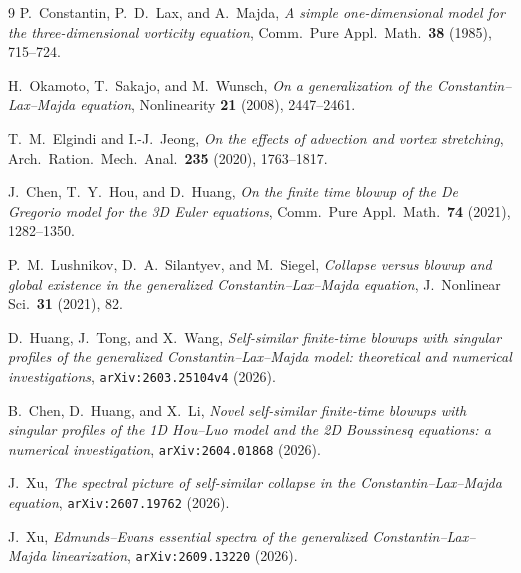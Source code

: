 \documentclass[11pt,a4paper]{article}
\begin{document}
\begin{thebibliography}{9}
P.~Constantin, P.~D.~Lax, and A.~Majda,
\emph{A simple one-dimensional model for the three-dimensional vorticity equation},
Comm.\ Pure Appl.\ Math.\ \textbf{38} (1985), 715--724.

H.~Okamoto, T.~Sakajo, and M.~Wunsch,
\emph{On a generalization of the Constantin--Lax--Majda equation},
Nonlinearity \textbf{21} (2008), 2447--2461.

T.~M.~Elgindi and I.-J.~Jeong,
\emph{On the effects of advection and vortex stretching},
Arch.\ Ration.\ Mech.\ Anal.\ \textbf{235} (2020), 1763--1817.

J.~Chen, T.~Y.~Hou, and D.~Huang,
\emph{On the finite time blowup of the De Gregorio model for the 3D Euler equations},
Comm.\ Pure Appl.\ Math.\ \textbf{74} (2021), 1282--1350.

P.~M.~Lushnikov, D.~A.~Silantyev, and M.~Siegel,
\emph{Collapse versus blowup and global existence in the generalized Constantin--Lax--Majda equation},
J.\ Nonlinear Sci.\ \textbf{31} (2021), 82.

D.~Huang, J.~Tong, and X.~Wang,
\emph{Self-similar finite-time blowups with singular profiles of the generalized Constantin--Lax--Majda model: theoretical and numerical investigations},
\texttt{arXiv:2603.25104v4} (2026).

B.~Chen, D.~Huang, and X.~Li,
\emph{Novel self-similar finite-time blowups with singular profiles of the 1D Hou--Luo model and the 2D Boussinesq equations: a numerical investigation},
\texttt{arXiv:2604.01868} (2026).

J.~Xu,
\emph{The spectral picture of self-similar collapse in the Constantin--Lax--Majda equation},
\texttt{arXiv:2607.19762} (2026).

J.~Xu,
\emph{Edmunds--Evans essential spectra of the generalized Constantin--Lax--Majda linearization},
\texttt{arXiv:2609.13220} (2026).
\end{thebibliography}
\end{document}
